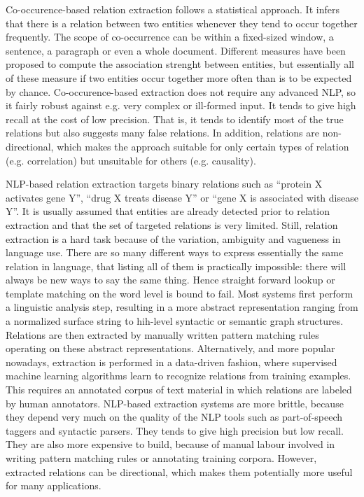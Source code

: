 Co-occurence-based relation extraction follows a statistical approach. It infers that there is a relation between two entities whenever they tend to occur together frequently. 
The scope of co-occurrence can be within a fixed-sized window, a sentence, a paragraph or even a whole document. 
Different measures have been proposed to compute the association strenght between entities, but essentially all of these measure if two entities occur together more often than is to be expected by chance. 
Co-occurence-based extraction does not require any advanced NLP, so it fairly robust against e.g. very complex or ill-formed input. It tends to give high recall at the cost of low precision. 
That is, it tends to identify most of the true relations but also suggests many false relations. 
In addition, relations are non-directional, which makes the approach suitable for only certain types of relation (e.g. correlation) but unsuitable for others (e.g. causality).

NLP-based relation extraction targets binary relations such as ``protein X activates gene Y'', ``drug X treats disease Y'' or ``gene X is associated with disease Y''.
It is usually assumed that entities are already detected prior to relation extraction and that the set of targeted relations is very limited.
Still, relation extraction is a hard task because of the variation, ambiguity and vagueness in language use.
There are so many different ways to express essentially the same relation in language, that listing all of them is practically impossible: there will always be new ways to say the same thing.
Hence straight forward lookup or template matching on the word level is bound to fail.
Most systems first perform a linguistic analysis step, resulting in a more abstract representation ranging from a normalized surface string to hih-level syntactic or semantic graph structures. 
Relations are then extracted by manually written pattern matching rules operating on these abstract representations.
Alternatively, and more popular nowadays, extraction is performed in a data-driven fashion, where supervised machine learning algorithms learn to recognize relations from training examples.
This requires an annotated corpus of text material in which relations are labeled by human annotators.
NLP-based extraction systems are more brittle, because they depend very much on the quality of the NLP tools such as part-of-speech taggers and syntactic parsers.
They tends to give high precision but low recall.
They are also more expensive to build, because of manual labour involved in writing pattern matching rules or annotating training corpora.
However, extracted relations can be directional, which makes them potentially more useful for many applications. 

